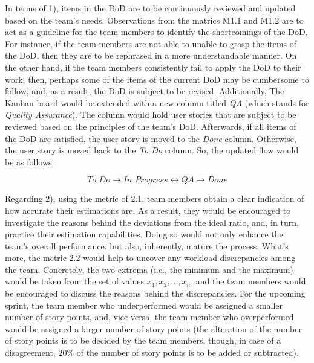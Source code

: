 \documentclass[conference]{IEEEtran}
\begin{document}
In terms of 1), items in the DoD are to be continuously reviewed and updated
based on the team's needs. Observations from the matrics M1.1 and M1.2 are to
act as a guideline for the team members to identify the shortcomings of the
DoD. For instance, if the team members are not able to unable to grasp the
items of the DoD, then they are to be rephrased in a more understandable
manner. On the other hand, if the team members consistently fail to apply the
DoD to their work, then, perhaps some of the items of the current DoD may be
cumbersome to follow, and, as a result, the DoD is subject to be revised.
Additionally, The Kanban board would be extended with a new column titled
\textit{QA} (which stands for \textit{Quality Assurance}). The column would
hold user stories that are subject to be reviewed based on the principles of
the team's DoD. Afterwards, if all items of the DoD are satisfied, the user
story is moved to the \textit{Done} column. Otherwise, the user story is moved
back to the \textit{To Do} column. So, the updated flow would be as follows:

$$\textit{To Do} \to \textit{In Progress} \leftrightarrow \textit{QA} \to
\textit{Done}$$


Regarding 2), using the metric of 2.1, team members obtain a clear indication
of how accurate their estimations are. As a result, they would be encouraged to
investigate the reasons behind the deviations from the ideal ratio, and, in
turn, practice their estimation capabilities. Doing so would not only enhance
the team's overall performance, but also, inherently, mature the process.
What's more, the metric 2.2 would help to uncover any workload discrepancies
among the team. Concretely, the two extrema (i.e., the minimum and the maximum)
would be taken from the set of values $x_1, x_2, \dots, x_n$, and the team
members would be encouraged to discuss the reasons behind the discrepancies.
For the upcoming sprint, the team member who underperformed would be assigned a
smaller number of story points, and, vice versa, the team member who
overperformed would be assigned a larger number of story points (the alteration
of the number of story points is to be decided by the team members, though, in
case of a disagreement, $20\%$ of the number of story points is to be added or
subtracted).
\end{document}
